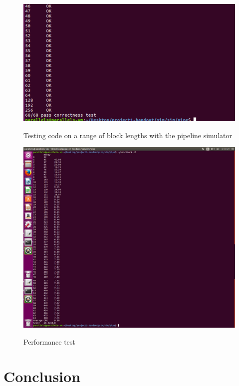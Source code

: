\documentclass{article}
\begin{document}
\begin{figure}[H]	
	\begin{minipage}[h]{\textwidth}	
		\centering
		\includegraphics[width=1\textwidth]{range_block_pipeline.png}
		\caption{Testing code on a range of block lengths with the pipeline simulator} \label{Fig-G12}
		\hspace{5mm}
		\includegraphics[width=1\textwidth]{performance_test.jpg}
		\caption{Performance test} \label{Fig-G13}
		\hspace{5mm}	
	\end{minipage}
\end{figure}

\section{Conclusion}
\end{document}
